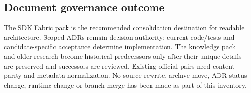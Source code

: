 \documentclass[
  10pt,
]{article}
\begin{document}
\enlargethispage{2\baselineskip}
\hypertarget{document-governance-outcome}{%
\subsection{Document governance
outcome}\label{document-governance-outcome}}

The SDK Fabric pack is the recommended consolidation destination for
readable architecture. Scoped ADRs remain decision authority; current
code/tests and candidate-specific acceptance determine implementation.
The knowledge pack and older research become historical predecessors
only after their unique details are preserved and successors are
reviewed. Existing official pairs need content parity and metadata
normalization. No source rewrite, archive move, ADR status change,
runtime change or branch merge has been made as part of this inventory.
\end{document}
